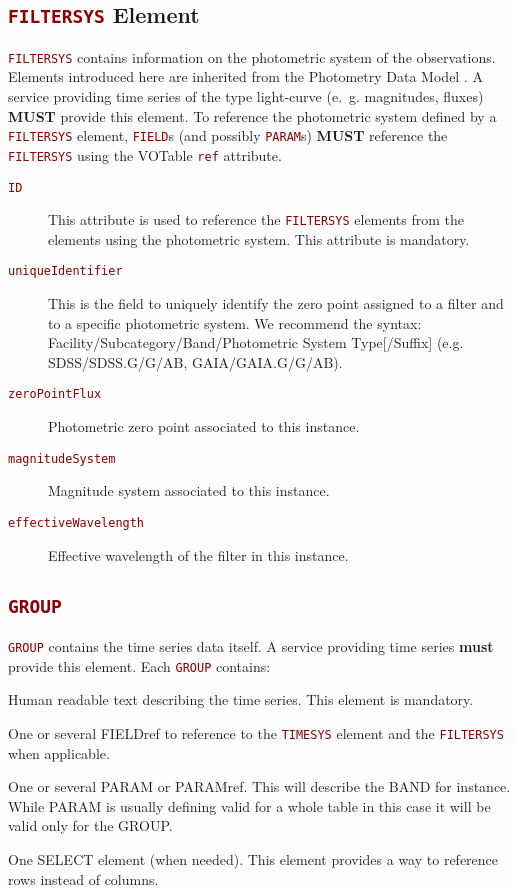 \documentclass[11pt,a4paper]{ivoa}
\newcommand\elem[1]{\textcolor{DarkRed}{{\tt#1}}}
\begin{document}
\subsection{\elem{FILTERSYS} Element}
\elem{FILTERSYS} contains information on the photometric system of the observations. Elements introduced here are inherited from the Photometry Data Model \cite{XX}. A service providing time series of the type light-curve (e.~g. magnitudes, fluxes) \textbf{MUST} provide this element. To reference the photometric system defined by a \elem{FILTERSYS} element, \elem{FIELD}s (and possibly \elem{PARAM}s) \textbf{MUST} reference the \elem{FILTERSYS} using the VOTable \elem{ref} attribute. 
\begin{description}
     \item[\elem{ID}] This attribute is used to reference the \elem{FILTERSYS} elements from the elements using the photometric system. This attribute is mandatory.
     \item[\elem{uniqueIdentifier}] This is the field to uniquely identify the zero point assigned to a filter and to a specific photometric system. We recommend the syntax: Facility/Subcategory/Band/Photometric System Type[/Suffix] (e.g. SDSS/SDSS.G/G/AB, GAIA/GAIA.G/G/AB). 
     \item[\elem{zeroPointFlux}] Photometric zero point associated to this instance. 
     \item[\elem{magnitudeSystem}] Magnitude system associated to this instance.
     \item[\elem{effectiveWavelength}] Effective wavelength of the filter in this instance. 
\end{description}


\subsection{\elem{GROUP}}
\elem{GROUP} contains the time series data itself. A service providing time series \textbf{must} provide this element. 
Each \elem{GROUP} contains:
\begin{description}
     \item[\elem{DESCRIPTION}] Human readable text describing the time series. This element is mandatory. 
     \item[\elem{FIELDref}] One or several FIELDref to reference to the \elem{TIMESYS} element and the \elem{FILTERSYS} when applicable. 
     \item One or several PARAM or PARAMref. This will describe the BAND for instance. While PARAM is usually defining valid for a whole table in this case it will be valid only for the GROUP.  
     \item One SELECT element (when needed). This element provides a way to reference rows instead of columns. 
\end{description}



\end{document}
